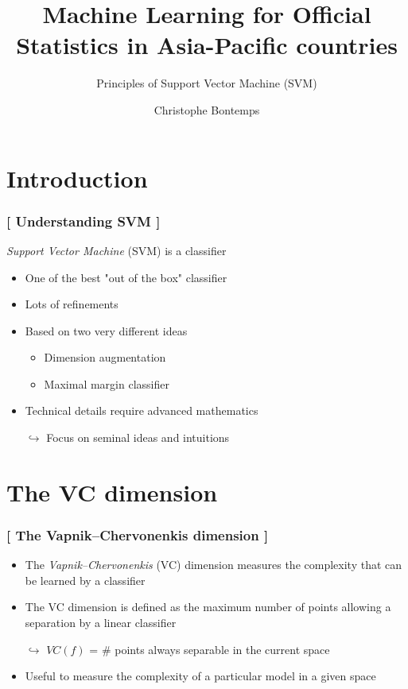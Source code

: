 \documentclass[xcolor=x11names,compress]{beamer}
\title{\textcolor{siap}{Machine Learning for Official Statistics in Asia-Pacific countries \\ \vspace{0.5cm} }}
\subtitle{\textcolor{brique}{\Large{Principles of Support Vector Machine (SVM)}}}
\author{\textcolor{siap}{Christophe Bontemps}}
\institute{ \texttt{[image: SIAP\_logo\_Big.png]}}
\date{}
\renewcommand{\(}{\begin{columns}}
\renewcommand{\)}{\end{columns}}
\newcommand{\<}[1]{\begin{column}{#1}}
\renewcommand{\>}{\end{column}}
\begin{document}
\begin{frame}
  \titlepage
\end{frame}


\section{Introduction}

\begin{frame} %
\frametitle{\textcolor{brique}{[ Understanding  SVM   ]}}
\textit{Support Vector Machine} (SVM) is a classifier\\
\pause
\begin{itemize}[<+->]
  \item One of the best "out of the box" classifier
  \item Lots of refinements
  \item Based on two very different ideas
  \begin{itemize}[<+->]
    \item Dimension augmentation
    \item Maximal margin classifier
  \end{itemize}
  \item Technical details require advanced mathematics
  \item[$\hookrightarrow$] Focus on seminal ideas and intuitions
\end{itemize}
\end{frame}

\section{The VC dimension}

\begin{frame} %
\frametitle{\textcolor{brique}{[ The  Vapnik–Chervonenkis dimension ]}}
\pause
\begin{itemize}[<+->]
    \item The \textit{Vapnik–Chervonenkis} (VC) dimension measures the complexity that can be learned by a classifier
    \item The VC dimension is defined as the maximum  number of points allowing a separation by a linear classifier
    \item[$\hookrightarrow$]  $ VC(f)$ = \# points always separable in the current space
    \item Useful to measure the complexity of a particular model in a given space
\end{itemize}
\end{frame}
\end{document}

